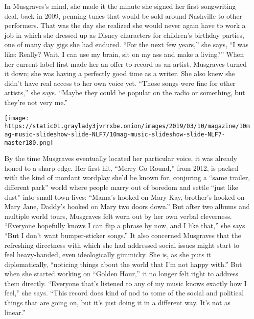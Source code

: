 In Musgraves's mind, she made it the minute she signed her first
songwriting deal, back in 2009, penning tunes that would be sold around
Nashville to other performers. That was the day she realized she would
never again have to work a job in which she dressed up as Disney
characters for children's birthday parties, one of many day gigs she had
endured. ``For the next few years,'' she says, ``I was like: Really?
Wait, I can use my brain, sit on my ass and make a living?'' When her
current label first made her an offer to record as an artist, Musgraves
turned it down; she was having a perfectly good time as a writer. She
also knew she didn't have real access to her own voice yet. ``Those
songs were fine for other artists,'' she says. ``Maybe they could be
popular on the radio or something, but they're not very me.''

\texttt{[image: https://static01.graylady3jvrrxbe.onion/images/2019/03/10/magazine/10mag-music-slideshow-slide-NLF7/10mag-music-slideshow-slide-NLF7-master180.png]}

By the time Musgraves eventually located her particular voice, it was
already honed to a sharp edge. Her first hit, ``Merry Go Round,'' from
2012, is packed with the kind of mordant wordplay she'd be known for,
conjuring a ``same trailer, different park'' world where people marry
out of boredom and settle ``just like dust'' into small-town lives:
``Mama's hooked on Mary Kay, brother's hooked on Mary Jane, Daddy's
hooked on Mary two doors down.'' But after two albums and multiple world
tours, Musgraves felt worn out by her own verbal cleverness. ``Everyone
hopefully knows I can flip a phrase by now, and I like that,'' she says.
``But I don't want bumper-sticker songs.'' It also concerned Musgraves
that the refreshing directness with which she had addressed social
issues might start to feel heavy-handed, even ideologically gimmicky.
She is, as she puts it diplomatically, ``noticing things about the world
that I'm not happy with.'' But when she started working on ``Golden
Hour,'' it no longer felt right to address them directly. ``Everyone
that's listened to any of my music knows exactly how I feel,'' she says.
``This record does kind of nod to some of the social and political
things that are going on, but it's just doing it in a different way.
It's not as linear.''

